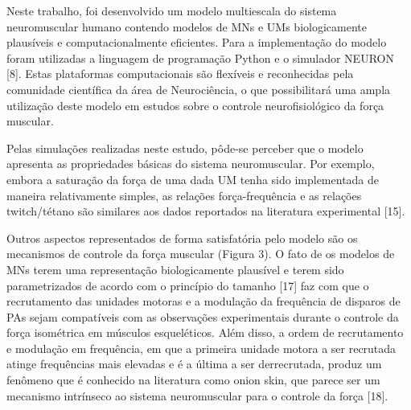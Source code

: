 Neste trabalho, foi desenvolvido um modelo multiescala do sistema neuromuscular humano contendo modelos de MNs e UMs biologicamente plausíveis e computacionalmente eficientes. Para a implementação do modelo foram utilizadas a linguagem de programação Python e o simulador NEURON [8]. Estas plataformas computacionais são flexíveis e reconhecidas pela comunidade científica da área de Neurociência, o que possibilitará uma ampla utilização deste modelo em estudos sobre o controle neurofisiológico da força muscular.

Pelas simulações realizadas neste estudo, pôde-se perceber que o modelo apresenta as propriedades básicas do sistema neuromuscular. Por exemplo, embora a saturação da força de uma dada UM tenha sido implementada de maneira relativamente simples, as relações força-frequência e as relações twitch/tétano são similares aos dados reportados na literatura experimental [15].

Outros aspectos representados de forma satisfatória pelo modelo são os mecanismos de controle da força muscular (Figura 3). O fato de os modelos de MNs terem uma representação biologicamente plausível e terem sido parametrizados de acordo com o princípio do tamanho [17] faz com que o recrutamento das unidades motoras e a modulação da frequência de disparos de PAs sejam compatíveis com as observações experimentais durante o controle da força isométrica em músculos esqueléticos. Além disso, a ordem de recrutamento e modulação em frequência, em que a primeira unidade motora a ser recrutada atinge frequências mais elevadas e é a última a ser derrecrutada, produz um fenômeno que é conhecido na literatura como onion skin, que parece ser um mecanismo intrínseco ao sistema neuromuscular para o controle da força [18].